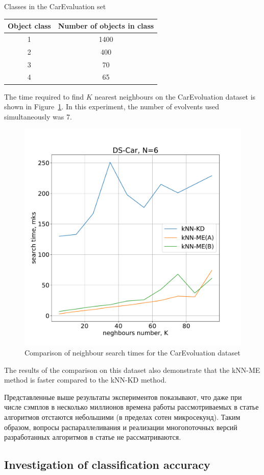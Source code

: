 \documentclass[entropy,article,submit,moreauthors,pdftex]{Definitions/mdpi}
\begin{document}
\begin{paracol}{2}
\begin{specialtable}[H] 
  \caption{Classes in the CarEvaluation set}\label{tab:t2}
	\center
\begin{tabular}{cc}
\toprule
	  Object class & Number of objects in class \\
\midrule													
		1 & 1400 \\ 
		2 & 400 \\
		3 & 70 \\
		4 & 65 \\
\bottomrule
\end{tabular}
\end{specialtable}

The time required to find $K$ nearest neighbours on the CarEvoluation dataset is shown in Figure~\ref{fig6a}. In this experiment, the number of evolvents used simultaneously was 7. 
\begin{figure}
\widefigure
\includegraphics[width=0.5\linewidth]{fig6a.pdf}
\caption{Comparison of neighbour search times for the CarEvoluation dataset\label{fig6a}}
\end{figure}
The results of the comparison on this dataset also demonstrate that the kNN-ME method is faster compared to the kNN-KD method.

\textcolor[rgb]{1,0,0}{Представленные выше результаты экспериментов показывают, что даже при числе сэмплов в несколько миллионов времена работы рассмотриваемых в статье алгоритмов отстаются небольшими (в пределах сотен микросекунд). Таким образом, вопросы распараллеливания и реализации многопоточных версий разработанных алгоритмов в статье не рассматриваются.}


\subsection{Investigation of classification accuracy}


\end{paracol}
\end{document}
